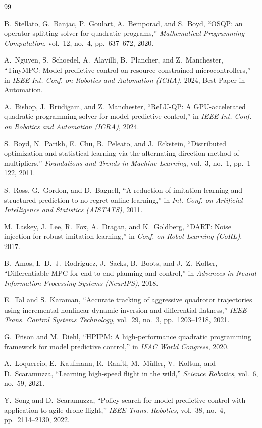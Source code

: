 \documentclass[conference]{IEEEtran}
\begin{document}

\begin{thebibliography}{99}

B.~Stellato, G.~Banjac, P.~Goulart, A.~Bemporad, and S.~Boyd, ``OSQP: an operator splitting solver for quadratic programs,'' \emph{Mathematical Programming Computation}, vol.~12, no.~4, pp.~637--672, 2020.

A.~Nguyen, S.~Schoedel, A.~Alavilli, B.~Plancher, and Z.~Manchester, ``TinyMPC: Model-predictive control on resource-constrained microcontrollers,'' in \emph{IEEE Int. Conf. on Robotics and Automation (ICRA)}, 2024, Best Paper in Automation.

A.~Bishop, J.~Brüdigam, and Z.~Manchester, ``ReLU-QP: A GPU-accelerated quadratic programming solver for model-predictive control,'' in \emph{IEEE Int. Conf. on Robotics and Automation (ICRA)}, 2024.

S.~Boyd, N.~Parikh, E.~Chu, B.~Peleato, and J.~Eckstein, ``Distributed optimization and statistical learning via the alternating direction method of multipliers,'' \emph{Foundations and Trends in Machine Learning}, vol.~3, no.~1, pp.~1--122, 2011.

S.~Ross, G.~Gordon, and D.~Bagnell, ``A reduction of imitation learning and structured prediction to no-regret online learning,'' in \emph{Int. Conf. on Artificial Intelligence and Statistics (AISTATS)}, 2011.

M.~Laskey, J.~Lee, R.~Fox, A.~Dragan, and K.~Goldberg, ``DART: Noise injection for robust imitation learning,'' in \emph{Conf. on Robot Learning (CoRL)}, 2017.

B.~Amos, I.~D.~J.~Rodriguez, J.~Sacks, B.~Boots, and J.~Z.~Kolter, ``Differentiable MPC for end-to-end planning and control,'' in \emph{Advances in Neural Information Processing Systems (NeurIPS)}, 2018.

E.~Tal and S.~Karaman, ``Accurate tracking of aggressive quadrotor trajectories using incremental nonlinear dynamic inversion and differential flatness,'' \emph{IEEE Trans. Control Systems Technology}, vol.~29, no.~3, pp.~1203--1218, 2021.

G.~Frison and M.~Diehl, ``HPIPM: A high-performance quadratic programming framework for model predictive control,'' in \emph{IFAC World Congress}, 2020.

A.~Loquercio, E.~Kaufmann, R.~Ranftl, M.~Müller, V.~Koltun, and D.~Scaramuzza, ``Learning high-speed flight in the wild,'' \emph{Science Robotics}, vol.~6, no.~59, 2021.

Y.~Song and D.~Scaramuzza, ``Policy search for model predictive control with application to agile drone flight,'' \emph{IEEE Trans. Robotics}, vol.~38, no.~4, pp.~2114--2130, 2022.

\end{thebibliography}
\end{document}
